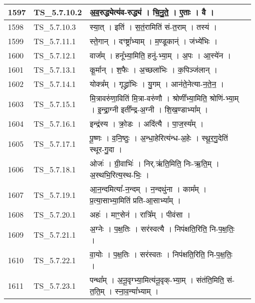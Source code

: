 \documentclass[17pt]{extarticle}
\begin{document}
\begin{longtable}{||p{0.4in}||p{0.9in}||p{4.0in}||p{0.9in}||}
        \hline
            1597 & TS\_5.7.10.2 & अ॒व॒रुद्ध्येत्य॑व{-}रुद्ध्य॑   ।   चि॒नु॒ते॒   ।   ए॒ताः   ।   वै   ।    &      \\
        \hline
            1598 & TS\_5.7.10.3 & स्या॒त्   ।   इति॑   ।   स॒तं॒रामिति॑ सं{-}त॒राम्   ।   तस्य॑   ।    &      \\
        \hline
            1599 & TS\_5.7.11.1 & स्ते॒गान्   ।   दꣳष्ट्रा᳚भ्याम्   ।   म॒ण्डूकान्॑   ।   जंभ्ये॑भिः   ।    &      \\
        \hline
            1600 & TS\_5.7.12.1 & वाज᳚म्   ।   हनू᳚भ्या॒मिति॒ हनु॑{-}भ्या॒म्   ।   अ॒पः   ।   आ॒स्ये॑न   ।    &      \\
        \hline
            1601 & TS\_5.7.13.1 & कू॒र्मान्   ।   श॒फैः   ।   अ॒च्छला॑भिः   ।   क॒पिञ्ज॑लान्   ।    &      \\
        \hline
            1602 & TS\_5.7.14.1 & योक्त्र᳚म्   ।   गृद्ध्रा॑भिः   ।   यु॒गम्   ।   आन॑ते॒नेत्या{-}न॒ते॒न॒   ।    &      \\
        \hline
            1603 & TS\_5.7.15.1 & मि॒त्रावरु॑णा॒विति॑ मि॒त्रा{-}वरु॑णौ   ।   श्रोणी᳚भ्या॒मिति॒ श्रोणि॑{-}भ्या॒म्   ।   इ॒न्द्रा॒ग्नी इती᳚न्द्र{-}अ॒ग्नी   ।   शि॒ख॒ण्डाभ्या᳚म्   ।    &      \\
        \hline
            1604 & TS\_5.7.16.1 & इन्द्र॑स्य   ।   क्रो॒डः   ।   अदि॑त्यै   ।   पा॒ज॒स्य᳚म्   ।    &      \\
        \hline
            1605 & TS\_5.7.17.1 & पू॒ष्णः   ।   व॒नि॒ष्ठुः   ।   अ॒न्धा॒हेरित्य॑न्ध{-}अ॒हेः   ।   स्थू॒र॒गु॒देति॑ स्थूर{-}गु॒दा   ।    &      \\
        \hline
            1606 & TS\_5.7.18.1 & ओजः॑   ।   ग्री॒वाभिः॑   ।   निर्.ऋ॑ति॒मिति॒ निः{-}ऋ॒ति॒म्   ।   अ॒स्थभि॒रित्य॒स्थ{-}भिः॒   ।    &      \\
        \hline
            1607 & TS\_5.7.19.1 & आ॒न॒न्दमित्या᳚{-}न॒न्दम्   ।   न॒न्दथु॑ना   ।   काम᳚म्   ।   प्र॒त्या॒साभ्या॒मिति॑ प्रति{-}आ॒साभ्या᳚म्   ।    &      \\
        \hline
            1608 & TS\_5.7.20.1 & अहः॑   ।   माꣳ॒॒सेन॑   ।   रात्रि᳚म्   ।   पीव॑सा   ।    &      \\
        \hline
            1609 & TS\_5.7.21.1 & अ॒ग्नेः   ।   प॒क्ष॒तिः   ।   सर॑स्वत्यै   ।   निप॑क्षति॒रिति॒ नि{-}प॒क्ष॒तिः॒   ।    &      \\
        \hline
            1610 & TS\_5.7.22.1 & वा॒योः   ।   प॒क्ष॒तिः   ।   सर॑स्वतः   ।   निप॑क्षति॒रिति॒ नि{-}प॒क्ष॒तिः॒   ।    &      \\
        \hline
            1611 & TS\_5.7.23.1 & पन्था᳚म्   ।   अ॒नू॒वृग्भ्या॒मित्य॑नू॒वृक्{-}भ्या॒म्   ।   संत॑ति॒मिति॒ सं{-}त॒ति॒म्   ।   स्ना॒व॒न्या᳚भ्याम्   ।    &      \\

\end{longtable}
\end{document}
